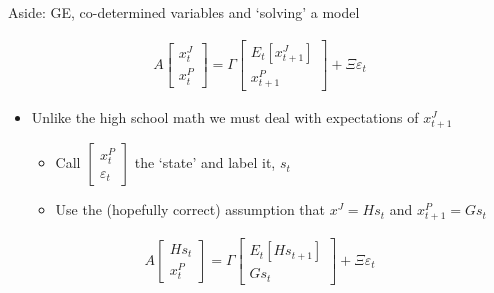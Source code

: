 \begin{frame}{Aside: GE, co-determined variables and `solving' a model}

\begin{gather*}
 A \begin{bmatrix} x^{J}_{t} \\ x^{P}_{t} \end{bmatrix}
 =
 \Gamma 
  \begin{bmatrix}
   E_{t}[ x^{J}_{t+1} ] \\ x^{P}_{t+1}
   \end{bmatrix}
 + 
 \Xi \varepsilon_{t}
\end{gather*}
\begin{itemize}
\item	Unlike the high school math we must deal with expectations of $x^{J}_{t+1}$
	\begin{itemize}
	\item	Call $\begin{bmatrix} x^{P}_{t} \\ \varepsilon_{t} \end{bmatrix}$ the `state' and label it, $s_{t}$
	\item	Use the (hopefully correct) assumption that $x^{J}=H s_{t}$ and $x^{P}_{t+1}=G s_{t}$
	\end{itemize}
\end{itemize}
\begin{gather*}
 A \begin{bmatrix} H s_{t} \\ x^{P}_{t} \end{bmatrix}
 =
 \Gamma 
  \begin{bmatrix}
   E_{t}[ H s_{t+1} ] \\ G s_{t}
   \end{bmatrix}
 + 
 \Xi \varepsilon_{t} \label{eqn:equilib_cond_guess}
\end{gather*}

\end{frame}


